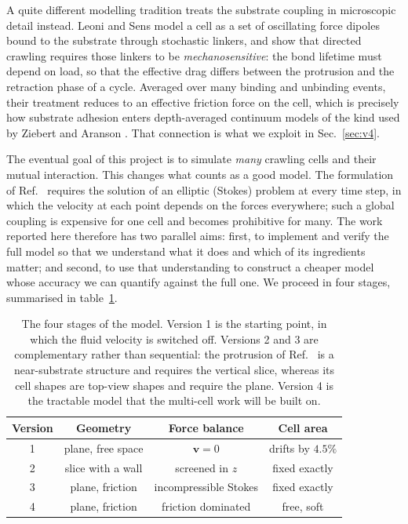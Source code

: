 \documentclass[11pt]{article}
\begin{document}
A quite different modelling tradition treats the substrate coupling in
microscopic detail instead. Leoni and Sens \cite{Leoni:2017} model a cell as a
set of oscillating force dipoles bound to the substrate through stochastic
linkers, and show that directed crawling requires those linkers to be
\textit{mechanosensitive}: the bond lifetime must depend on load, so that the
effective drag differs between the protrusion and the retraction phase of a
cycle. Averaged over many binding and unbinding events, their treatment reduces
to an effective friction force on the cell, which is precisely how substrate
adhesion enters depth-averaged continuum models of the kind used by Ziebert and
Aranson \cite{Ziebert:2013}. That connection is what we exploit in
Sec.~\ref{sec:v4}.

The eventual goal of this project is to simulate \textit{many} crawling cells and
their mutual interaction. This changes what counts as a good model. The
formulation of Ref.~\cite{Tjhung:2015} requires the solution of an elliptic
(Stokes) problem at every time step, in which the velocity at each point depends
on the forces everywhere; such a global coupling is expensive for one cell and
becomes prohibitive for many. The work reported here therefore has two parallel
aims: first, to implement and verify the full model so that we understand what it
does and which of its ingredients matter; and second, to use that understanding
to construct a cheaper model whose accuracy we can quantify against the full one.
We proceed in four stages, summarised in table~\ref{tab:versions}.

\begin{table} [ht!]
\begin{center}
\begin{tabular}{ |c|c|c|c| }
 \hline
 Version & Geometry & Force balance & Cell area \\
 \hline
 1 & plane, free space & $\mathbf{v}=0$ & drifts by $4.5\%$ \\
 \hline
 2 & slice with a wall & screened in $z$ & fixed exactly \\
 \hline
 3 & plane, friction & incompressible Stokes & fixed exactly \\
 \hline
 4 & plane, friction & friction dominated & free, soft \\
 \hline
\end{tabular}
\end{center}
\caption{The four stages of the model. Version 1 is the starting point, in which
the fluid velocity is switched off. Versions 2 and 3 are complementary rather
than sequential: the protrusion of Ref.~\cite{Tjhung:2015} is a near-substrate
structure and requires the vertical slice, whereas its cell shapes are top-view
shapes and require the plane. Version 4 is the tractable model that the
multi-cell work will be built on.}
\label{tab:versions}
\end{table}
\end{document}
